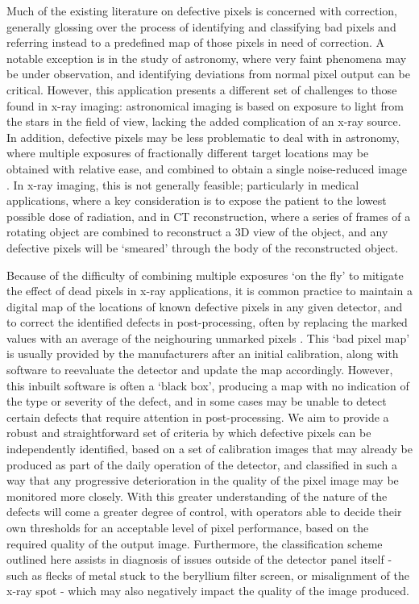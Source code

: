 \documentclass[../IO-Pixels.tex]{subfiles}
\begin{document}
Much of the existing literature on defective pixels is concerned with correction, generally glossing over the process of identifying and classifying bad pixels and referring instead to a predefined map of those pixels in need of correction.  A notable exception is in the study of astronomy, where very faint phenomena may be under observation, and identifying deviations from normal pixel output can be critical. However, this application presents a different set of challenges to those found in x-ray imaging: astronomical imaging is based on exposure to light from the stars in the field of view, lacking the added complication of an x-ray source. In addition, defective pixels may be less problematic to deal with in astronomy, where multiple exposures of fractionally different target locations may be obtained with relative ease, and combined to obtain a single noise-reduced image . In x-ray imaging, this is not generally feasible; particularly in medical applications, where a key consideration is to expose the patient to the lowest possible dose of radiation, and in CT reconstruction, where a series of frames of a rotating object are combined to reconstruct a 3D view of the object, and any defective pixels will be `smeared' through the body of the reconstructed object\CN{}.

Because of the difficulty of combining multiple exposures `on the fly' to mitigate the effect of dead pixels in x-ray applications, it is common practice to maintain a digital map of the locations of known defective pixels in any given detector, and to correct the identified defects in post-processing, often by replacing the marked values with an average of the neighouring unmarked pixels \citep{Sun1994, Wang1999}. This `bad pixel map' is usually provided by the manufacturers after an initial calibration, along with software to reevaluate the detector and update the map accordingly. However, this inbuilt software is often a `black box', producing a map with no indication of the type or severity of the defect, and in some cases may be unable to detect certain defects that require attention in post-processing. We aim to provide a robust and straightforward set of criteria by which defective pixels can be independently identified, based on a set of calibration images that may already be produced as part of the daily operation of the detector, and classified in such a way that any progressive deterioration in the quality of the pixel image may be monitored more closely. With this greater understanding of the nature of the defects will come a greater degree of control, with operators able to decide their own thresholds for an acceptable level of pixel performance, based on the required quality of the output image. Furthermore, the classification scheme outlined here assists in diagnosis of issues outside of the detector panel itself - such as flecks of metal stuck to the beryllium filter screen, or misalignment of the x-ray spot - which may also negatively impact the quality of the image produced.
\end{document}
